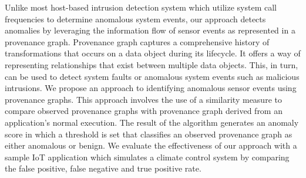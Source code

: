  \par Unlike most host-based intrusion detection system which utilize system call frequencies to determine anomalous system events, our approach detects anomalies by leveraging the information flow of sensor events as represented in a provenance graph. Provenance graph captures a comprehensive history of transformations that occurs on a data object during its lifecycle. It offers a way of representing relationships that exist between multiple data objects. This, in turn, can be used to detect system faults or anomalous system events such as malicious intrusions. We propose an approach to identifying anomalous sensor events using provenance graphs. This approach involves the use of a similarity measure to compare observed provenance graphs with provenance graph derived from an application's normal execution. The result of the algorithm generates an anomaly score in which a threshold is set that classifies an observed provenance graph as either anomalous or benign. We evaluate the effectiveness of our approach with a sample IoT application which simulates a climate control system by comparing the false positive, false negative and true positive rate.




